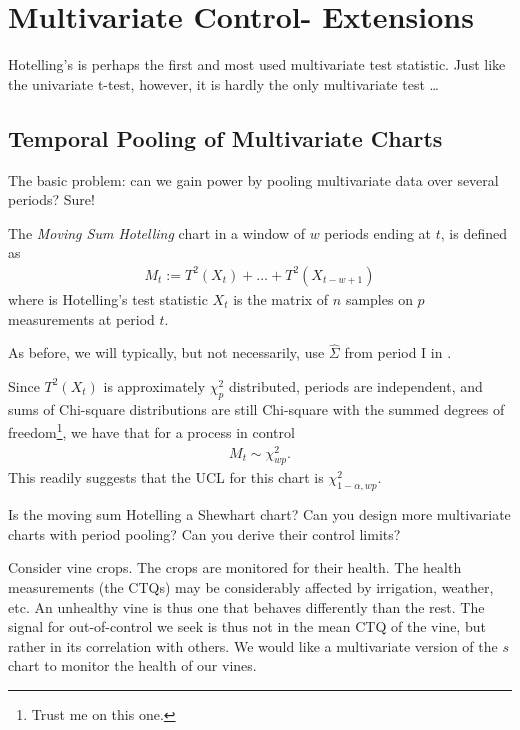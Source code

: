 \section[Multivariate extensions]{Multivariate Control- Extensions}

Hotelling's \tsq is perhaps the first and most used multivariate test statistic.
Just like the univariate t-test, however, it is hardly the only multivariate test \dots





\subsection{Temporal Pooling of Multivariate Charts}
The basic problem: can we gain power by pooling multivariate data over several periods?
Sure!

\begin{definition}
	The \emph{Moving Sum Hotelling} chart in a window of $w$ periods ending at $t$, is defined as
	\begin{align}
	M_t:= T^2(X_t)+\dots+T^2(X_{t-w+1})
	\end{align}
	where \tsq is Hotelling's test statistic $X_t$ is the matrix of $n$ samples on $p$ measurements at period $t$. 
\end{definition}
As before, we will typically, but not necessarily, use $\hat{\Sigma}$ from period I in \tsq. 

Since $T^2(X_t)$ is approximately $\chi^2_p$ distributed, periods are independent, and sums of Chi-square distributions are still Chi-square with the summed degrees of freedom\footnote{Trust me on this one.}, we have that for a process in control
\begin{align}
M_t \sim \chi^2_{wp}.
\end{align}
This readily suggests that the UCL for this chart is $\chi^2_{1-\alpha,wp}$. 

\begin{think}
	Is the moving sum Hotelling a Shewhart chart? 
	Can you design more multivariate charts with period pooling? 
	Can you derive their control limits?
\end{think}









\begin{example}
\label{eg:irrigation}
Consider vine crops.
The crops are monitored for their health.
The health measurements (the CTQs) may be considerably affected by irrigation, weather, etc.
An unhealthy vine is thus one that behaves differently than the rest. 
The signal for out-of-control we seek is thus not in the mean CTQ of the vine, but rather in its correlation with others. 
We would like a multivariate version of the $s$ chart to monitor the health of our vines.  
\end{example}





